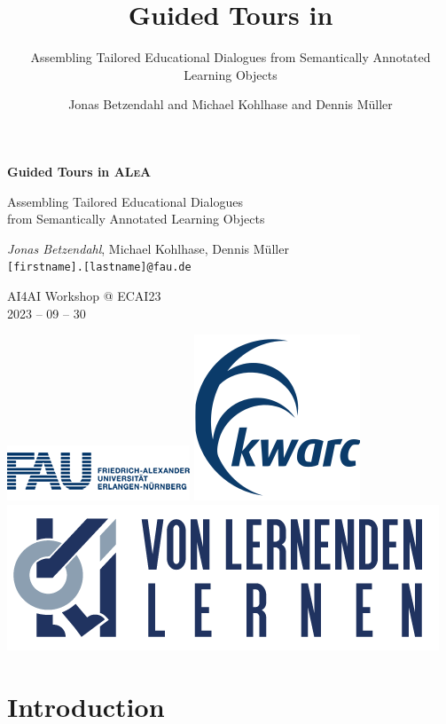 \documentclass[aspectratio=169, usenames, dvipsnames]{beamer}
\author{Jonas Betzendahl and Michael Kohlhase and Dennis Müller}
\title{Guided Tours in \ALeA}
\subtitle{Assembling Tailored Educational Dialogues from Semantically Annotated Learning Objects}
\def\ALeA{\textsc{ALeA}\xspace}
\begin{document}
\begin{frame}
\begin{center}
\huge \textbf{Guided Tours in \ALeA}\medskip

\large Assembling Tailored Educational Dialogues\\ from Semantically Annotated Learning Objects

\normalsize 
\bigskip\bigskip

\large \emph{Jonas Betzendahl}, Michael Kohlhase, Dennis Müller\\
\texttt{[firstname].[lastname]@fau.de}\bigskip

\small
AI4AI Workshop @ ECAI23\\
2023 -- 09 -- 30
\bigskip

\includegraphics[scale=0.5]{images/fau_logo.png}
\quad
\includegraphics[scale=0.25]{images/kwarclogo_faublau.png} 
\quad
\includegraphics[scale=0.18]{images/voll-ki} 
\end{center}
\end{frame}

\section{Introduction}
\end{document}
